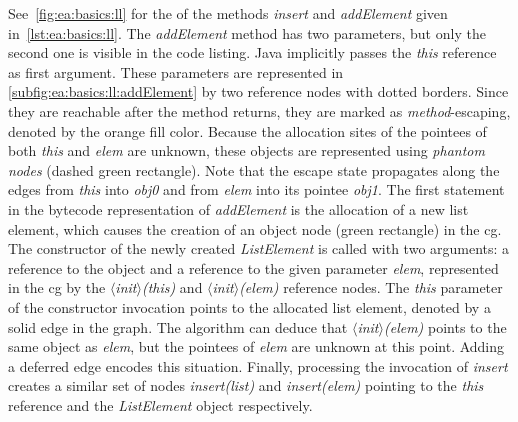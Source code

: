 			See~\cref{fig:ea:basics:ll} for the  of the methods \emph{insert} and \emph{addElement} given
			in~\cref{lst:ea:basics:ll}. The \emph{addElement} method has two parameters, but only the second one is visible in
			the code listing. Java implicitly passes the \emph{this} reference as first argument. These parameters are
			represented in \cref{subfig:ea:basics:ll:addElement} by two reference nodes with dotted borders. Since they are
			reachable after the method returns, they are marked as \emph{method}-escaping, denoted by the orange fill color.
			Because the allocation sites of the pointees of both \emph{this} and \emph{elem} are unknown, these objects are
			represented using \emph{phantom nodes} (dashed green rectangle). Note that the escape state propagates along the
			edges from \emph{this} into \emph{obj0} and from \emph{elem} into its pointee \emph{obj1}. The first statement in
			the bytecode representation of \emph{addElement} is the allocation of a new list element, which causes the
			creation of an object node (green rectangle) in the \gls{cg}. The constructor of the newly created
			\emph{ListElement} is called with two arguments: a reference to the object and a reference to the given parameter
			\emph{elem}, represented in the \acrlong{cg} by the \emph{$\langle$init$\rangle$(this)} and
			\emph{$\langle$init$\rangle$(elem)} reference nodes. The \emph{this} parameter of the constructor invocation
			points to the allocated list element, denoted by a solid edge in the graph. The algorithm can deduce that
			\emph{$\langle$init$\rangle$(elem)} points to the same object as \emph{elem}, but the pointees of \emph{elem} are
			unknown at this point. Adding a deferred edge encodes this situation. Finally, processing the invocation of
			\emph{insert} creates a similar set of nodes \emph{insert(list)} and \emph{insert(elem)} pointing to the
			\emph{this} reference and the \emph{ListElement} object respectively.

